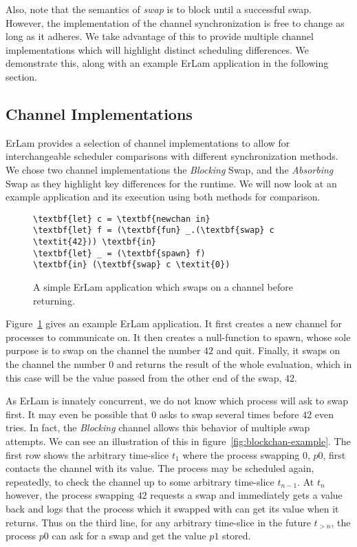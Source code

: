 Also, note that the semantics of \emph{swap} is to block until a successful swap. 
However, the implementation of the channel synchronization is free to change as 
long as it adheres. We take advantage of this to provide multiple channel 
implementations which will highlight distinct scheduling differences. We 
demonstrate this, along with an example ErLam application in the following 
section.

\subsection{Channel Implementations}\label{sec:channel implementations}

ErLam provides a selection of channel implementations to allow for 
interchangeable scheduler comparisons with different synchronization methods.
We chose two channel implementations the 
{\sl Blocking} Swap, and the {\sl Absorbing} Swap as they highlight key differences
for the runtime. We will now look at an example application and its execution
using both methods for comparison.

\begin{figure}
    \centering
\begin{BVerbatim}[commandchars=\\\{\}]
\textbf{let} c = \textbf{newchan in}
\textbf{let} f = (\textbf{fun} _.(\textbf{swap} c \textit{42})) \textbf{in}
\textbf{let} _ = (\textbf{spawn} f)
\textbf{in} (\textbf{swap} c \textit{0})
\end{BVerbatim}
    \caption{
        A simple ErLam application which swaps on a channel before returning.}
    \label{fig:swap-example}
\end{figure}

Figure~\ref{fig:swap-example} gives an example ErLam application. It first 
creates a new channel for processes to communicate on. It then creates a 
null-function to spawn, whose sole purpose is to swap on the channel the number
$42$ and quit. Finally, it swaps on the channel the number $0$ and returns
the result of the whole evaluation, which in this case will be the value passed
from the other end of the swap, $42$. 

As ErLam is innately concurrent, we do not know which process will ask to swap
first. It may even be possible that $0$ asks to swap several times before $42$
even tries. In fact, the {\sl Blocking} channel allows this behavior of 
multiple swap attempts.
We can see an illustration of this in figure~\ref{fig:blockchan-example}.
The first row shows the arbitrary time-slice $t_1$ where the process swapping $0$, 
$p0$, first contacts the channel with its value. The process may be scheduled again,
repeatedly, to check the channel up to some arbitrary time-slice $t_{n-1}$. At
$t_n$ however, the process swapping $42$ requests a swap and immediately gets a
value back and logs that the process which it swapped with can get its value
when it returns. Thus on the third line, for any arbitrary time-slice in the 
future $t_{>n}$, the process $p0$ can ask for a swap and get the value $p1$ 
stored.

